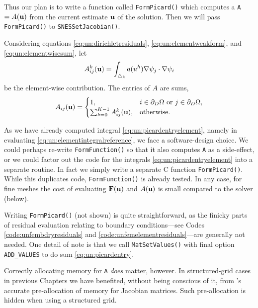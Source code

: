 Thus our plan is to write a function called \texttt{FormPicard()} which computes a \pMat \texttt{A} $=A(\mathbf{u})$ from the current estimate $\mathbf{u}$ of the solution.  Then we will pass \texttt{FormPicard()} to \texttt{SNESSetJacobian()}.

Considering equations \eqref{eq:un:dirichletresiduals}, \eqref{eq:un:elementweakform}, and \eqref{eq:un:elementwisesum}, let
\begin{equation}
A_{ij}^k(\mathbf{u}) = \int_{\triangle_k} a(u^h) \nabla\psi_j \cdot \nabla\psi_i \label{eq:un:picardentryelement}
\end{equation}
be the element-wise contribution.  The entries of $A$ are sums,
\begin{equation}
A_{ij}(\mathbf{u}) =  \begin{cases}
               1, & i \in \partial_D\Omega \text{ or } j \in \partial_D\Omega, \\
               \sum_{k=0}^{K-1} A_{ij}^k(\mathbf{u}), & \text{otherwise}.
               \end{cases} \label{eq:un:picardentry}
\end{equation}

As we have already computed integral \eqref{eq:un:picardentryelement}, namely in evaluating \eqref{eq:un:elementintegralreference}, we face a software-design choice.  We could perhaps re-write \texttt{FormFunction()} so that it also computes \texttt{A} as a side-effect, or we could factor out the code for the integrals \eqref{eq:un:picardentryelement} into a separate routine.  In fact we simply write a separate C function \texttt{FormPicard()}.  While this duplicates code, \texttt{FormFunction()} is already tested.  In any case, for fine meshes the cost of evaluating $\mathbf{F}(\mathbf{u})$ and $A(\mathbf{u})$ is small compared to the solver (below).

Writing \texttt{FormPicard()} (not shown) is quite straightforward, as the finicky parts of residual evaluation relating to boundary conditions---see Codes \ref{code:unfembdryresiduals} and \ref{code:unfemelementresiduals}---are generally not needed.  One detail of note is that we call \texttt{MatSetValues()} with final option \texttt{ADD\_VALUES} to do sum \eqref{eq:un:picardentry}.

Correctly allocating memory for \pMat \texttt{A} \emph{does} matter, however.  In structured-grid cases in previous Chapters we have benefited, without being conscious of it, from \PETSc's accurate pre-allocation of memory for Jacobian matrices.  Such pre-allocation is hidden when using a \pDMDA structured grid.

